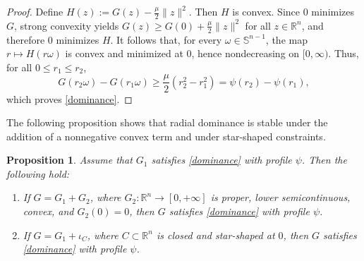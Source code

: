 \documentclass[11pt]{article}
\newcommand{\1}{\mathds{1}}
\newtheorem{proposition}[theorem]{Proposition}
\theoremstyle{definition}
\theoremstyle{remark}
\theoremstyle{definition}
\begin{document}
\begin{proof}
Define \(H(z):=G(z)-\frac{\mu}{2}\|z\|^2\). Then \(H\) is convex. Since \(0\) minimizes \(G\), strong convexity yields \(G(z)\ge G(0)+\frac{\mu}{2}\|z\|^2\) for all \(z\in\mathbb R^n\), and therefore \(0\) minimizes \(H\). It follows that, for every \(\omega\in\mathbb S^{n-1}\), the map \(r\mapsto H(r\omega)\) is convex and minimized at \(0\), hence nondecreasing on \([0,\infty)\). Thus, for all \(0\le r_1\le r_2\),
\[
G(r_2\omega)-G(r_1\omega)\ge \frac{\mu}{2}(r_2^2-r_1^2)=\psi(r_2)-\psi(r_1),
\]
which proves \eqref{dominance}.
\end{proof}


The following proposition shows that radial dominance is stable under the addition of a nonnegative convex term and under star-shaped constraints.
\begin{proposition}\label{stability}
Assume that \(G_1\) satisfies \eqref{dominance} with profile \(\psi\). Then the following hold:
\begin{enumerate}
\item[(i)] If \(G=G_1+G_2\), where \(G_2 \colon \mathbb{R}^n\to[0,+\infty]\) is proper,
    lower semicontinuous, convex, and \(G_2(0)=0\), then \(G\) satisfies
    \eqref{dominance} with profile \(\psi\).
\item[(ii)] If \(G=G_1+\iota_C\), where \(C\subset \mathbb{R}^n\) is closed and
    star-shaped at \(0\), then \(G\) satisfies \eqref{dominance} with profile \(\psi\).
\end{enumerate}
\end{proposition}
\end{document}
